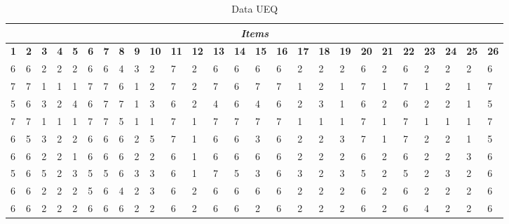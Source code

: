 \begin{landscape}
    \begin{table}
        \centering
        \caption{Data UEQ}
        \begin{tabular}{|p{0.5cm}|p{0.5cm}|p{0.5cm}|p{0.5cm}|p{0.5cm}|p{0.5cm}|p{0.5cm}|p{0.5cm}|p{0.5cm}|p{0.5cm}|p{0.5cm}|p{0.5cm}|p{0.5cm}|p{0.5cm}|p{0.5cm}|p{0.5cm}|p{0.5cm}|p{0.5cm}|p{0.5cm}|p{0.5cm}|p{0.5cm}|p{0.5cm}|p{0.5cm}|p{0.5cm}|p{0.5cm}|p{0.5cm}|}
        \hline
        \multicolumn{26}{|c|}{\centering \textit{Items}} \\
        \hline
        \textbf{1}&\textbf{2}&\textbf{3}&\textbf{4}&\textbf{5}&\textbf{6}&\textbf{7}&\textbf{8}&\textbf{9}&\textbf{10}&\textbf{11}&\textbf{12}&\textbf{13}&\textbf{14}&\textbf{15}&\textbf{16}&\textbf{17}&\textbf{18}&\textbf{19}&\textbf{20}&\textbf{21}&\textbf{22}&\textbf{23}&\textbf{24}&\textbf{25}&\textbf{26} \\
        \hline
        6 & 6 & 2 & 2 & 2 & 6 & 6 & 4 & 3 & 2  & 7  & 2  & 6  & 6  & 6  & 6  & 2  & 2  & 2  & 6  & 2  & 6  & 2  & 2  & 2  & 6  \\
        \hline
        7 & 7 & 1 & 1 & 1 & 7 & 7 & 6 & 1 & 2  & 7  & 2  & 7  & 6  & 7  & 7  & 1  & 2  & 1  & 7  & 1  & 7  & 1  & 2  & 1  & 7  \\
        \hline
        5 & 6 & 3 & 2 & 4 & 6 & 7 & 7 & 1 & 3  & 6  & 2  & 4  & 6  & 4  & 6  & 2  & 3  & 1  & 6  & 2  & 6  & 2  & 2  & 1  & 5  \\
        \hline
        7 & 7 & 1 & 1 & 1 & 7 & 7 & 5 & 1 & 1  & 7  & 1  & 7  & 7  & 7  & 7  & 1  & 1  & 1  & 7  & 1  & 7  & 1  & 1  & 1  & 7  \\
        \hline
        6 & 5 & 3 & 2 & 2 & 6 & 6 & 6 & 2 & 5  & 7  & 1  & 6  & 6  & 3  & 6  & 2  & 2  & 3  & 7  & 1  & 7  & 2  & 2  & 1  & 5  \\
        \hline
        6 & 6 & 2 & 2 & 1 & 6 & 6 & 6 & 2 & 2  & 6  & 1  & 6  & 6  & 6  & 6  & 2  & 2  & 2  & 6  & 2  & 6  & 2  & 2  & 3  & 6  \\
        \hline
        5 & 6 & 5 & 2 & 3 & 5 & 5 & 6 & 3 & 3  & 6  & 1  & 7  & 5  & 3  & 6  & 3  & 2  & 3  & 5  & 2  & 5  & 2  & 3  & 2  & 6  \\
        \hline
        6 & 6 & 2 & 2 & 2 & 5 & 6 & 4 & 2 & 3  & 6  & 2  & 6  & 6  & 6  & 6  & 2  & 2  & 2  & 6  & 2  & 6  & 2  & 2  & 2  & 6  \\
        \hline
        6 & 6 & 2 & 2 & 2 & 6 & 6 & 6 & 2 & 2  & 6  & 2  & 6  & 6  & 2  & 6  & 2  & 2  & 2  & 6  & 2  & 6  & 4  & 2  & 2  & 6  \\

\end{tabular}
\end{table}
\end{landscape}
